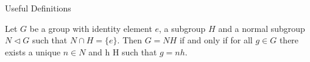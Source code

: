 \documentclass[final]{beamer}
\newlength{\colwidth}
\begin{document}
\begin{frame}[t]
\begin{columns}[t]
\begin{column}{\colwidth}
                          





  \begin{alertblock}{Useful Definitions}


     Let $G$ be a group with identity element $e$, a subgroup $H$ and a normal subgroup $N \triangleleft G$ such that $N \cap H = \{e\}$.
    Then $G = N H$ if and only if for all $g \in G$ there exists a unique $n \in N$ and h \in H such that $g = nh$.


\end{alertblock}
\end{column}
\end{columns}
\end{frame}
\end{document}

